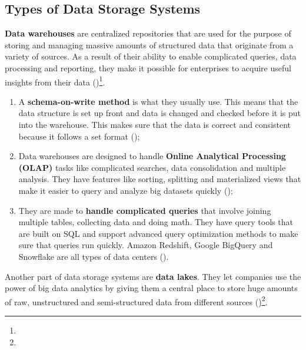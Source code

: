 \subsection{Types of Data Storage Systems}

\textbf{Data warehouses} are centralized repositories that are used for the purpose of storing and managing massive amounts of structured data that originate from a variety of sources. As a result of their ability to enable complicated queries, data processing and reporting, they make it possible for enterprises to acquire useful insights from their data (\cite{Nambiar2022AnOO})\footnote[20]{}.

\begin{enumerate}
    \item A \textbf{schema-on-write method} is what they usually use. This means that the data structure is set up front and data is changed and checked before it is put into the warehouse. This makes sure that the data is correct and consistent because it follows a set format (\cite{Nambiar2022AnOO})\footnotemark[20];
    \item Data warehouses are designed to handle \textbf{Online Analytical Processing (OLAP)} tasks like complicated searches, data consolidation and multiple analysis. They have features like sorting, splitting and materialized views that make it easier to query and analyze big datasets quickly (\cite{Nambiar2022AnOO})\footnotemark[20];
    \item They are made to \textbf{handle complicated queries} that involve joining multiple tables, collecting data and doing math. They have query tools that are built on SQL and support advanced query optimization methods to make sure that queries run quickly. Amazon Redshift, Google BigQuery and Snowflake are all types of data centers (\cite{Nambiar2022AnOO})\footnotemark[20].
\end{enumerate}

Another part of data storage systems are \textbf{data lakes}. They let companies use the power of big data analytics by giving them a central place to store huge amounts of raw, unstructured and semi-structured data from different sources (\cite{Nambiar2022AnOO})\footnote[20]{}.

